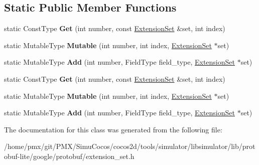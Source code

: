 \subsection*{Static Public Member Functions}
\begin{DoxyCompactItemize}
\item 
\mbox{\label{classgoogle_1_1protobuf_1_1internal_1_1RepeatedMessageTypeTraits_a4acb574ddebd41e46207a36f5effe038}} 
static Const\+Type {\bfseries Get} (int number, const \hyperlink{classgoogle_1_1protobuf_1_1internal_1_1ExtensionSet}{Extension\+Set} \&set, int index)
\item 
\mbox{\label{classgoogle_1_1protobuf_1_1internal_1_1RepeatedMessageTypeTraits_a64125e47c2df5f7c1236bd06aabe6683}} 
static Mutable\+Type {\bfseries Mutable} (int number, int index, \hyperlink{classgoogle_1_1protobuf_1_1internal_1_1ExtensionSet}{Extension\+Set} $\ast$set)
\item 
\mbox{\label{classgoogle_1_1protobuf_1_1internal_1_1RepeatedMessageTypeTraits_a1485ff325d763018361ca803c0932b45}} 
static Mutable\+Type {\bfseries Add} (int number, Field\+Type field\+\_\+type, \hyperlink{classgoogle_1_1protobuf_1_1internal_1_1ExtensionSet}{Extension\+Set} $\ast$set)
\item 
\mbox{\label{classgoogle_1_1protobuf_1_1internal_1_1RepeatedMessageTypeTraits_a4acb574ddebd41e46207a36f5effe038}} 
static Const\+Type {\bfseries Get} (int number, const \hyperlink{classgoogle_1_1protobuf_1_1internal_1_1ExtensionSet}{Extension\+Set} \&set, int index)
\item 
\mbox{\label{classgoogle_1_1protobuf_1_1internal_1_1RepeatedMessageTypeTraits_a64125e47c2df5f7c1236bd06aabe6683}} 
static Mutable\+Type {\bfseries Mutable} (int number, int index, \hyperlink{classgoogle_1_1protobuf_1_1internal_1_1ExtensionSet}{Extension\+Set} $\ast$set)
\item 
\mbox{\label{classgoogle_1_1protobuf_1_1internal_1_1RepeatedMessageTypeTraits_a1485ff325d763018361ca803c0932b45}} 
static Mutable\+Type {\bfseries Add} (int number, Field\+Type field\+\_\+type, \hyperlink{classgoogle_1_1protobuf_1_1internal_1_1ExtensionSet}{Extension\+Set} $\ast$set)
\end{DoxyCompactItemize}


The documentation for this class was generated from the following file\+:\begin{DoxyCompactItemize}
\item 
/home/pmx/git/\+P\+M\+X/\+Simu\+Cocos/cocos2d/tools/simulator/libsimulator/lib/protobuf-\/lite/google/protobuf/extension\+\_\+set.\+h\end{DoxyCompactItemize}
